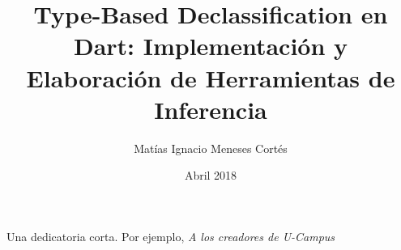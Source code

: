 \documentclass[upright, contnum]{umemoria}
\author{Matías Ignacio Meneses Cortés}
\title{Type-Based Declassification en Dart: Implementación y Elaboración de Herramientas de Inferencia}
\date{Abril 2018}
\begin{document}
\setcounter{chapter}{1}
\frontmatter
\maketitle

\begin{abstract}
{\lipsum[1-1]}
\end{abstract}

\begin{dedicatoria} %
Una dedicatoria corta. Por ejemplo, \emph{A los creadores de U-Campus}
\end{dedicatoria}

\begin{thanks} %
\lipsum[1-2]
\end{thanks}
\cleardoublepage

\tableofcontents
\listoftables %
\listoffigures %

\mainmatter














\end{document}
